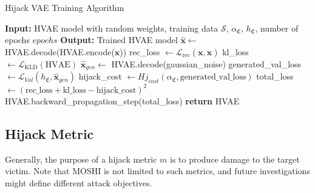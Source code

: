 \begin{algorithm}[H]
\footnotesize
    \caption{Hijack VAE Training Algorithm}
    \begin{algorithmic}[1]
        \State \textbf{Input:} HVAE model with random weights, training data $\mathcal{S}$, $\alpha_{\mathfrak{C}}$, $h_{\mathfrak{C}}$, number of epochs $epochs$
        \State \textbf{Output:} Trained HVAE model
                \State $\hat{\bm{x}} \gets $ HVAE.decode(HVAE.encode($\bm{x}$))  %
                \State rec\_loss $\gets \mathcal{L}_{\mathrm{rec}}(\bm{x}, \hat{\bm{x}})$  %
                \State kl\_loss $\gets \mathcal{L}_{\mathrm{KLD}}(\mathrm{HVAE})$  %
                \State $\hat{\bm{x}}_{gen} \gets$ HVAE.decode(gaussian\_noise)  %
                \State generated\_val\_loss $\gets \mathcal{L}_{Val}(h_{\mathfrak{C}}, \hat{\bm{x}}_{gen})$  %
                \State hijack\_cost $\gets Hj_{cost}(\alpha_{\mathfrak{C}}, \mathrm{generated\_val\_loss})$  %
                \State total\_loss $ \gets(\mathrm{rec\_loss + kl\_loss - hijack\_cost})^2 $  %
                \State HVAE.backward\_propagation\_step(total\_loss)  %
            \EndFor
        \EndFor
        \State \textbf{return} HVAE
    \end{algorithmic}
    \label{alg.HVAE}
\end{algorithm}

\subsection{Hijack Metric}
\label{ssec.hm-theory}
Generally, the purpose of a hijack metric $m$ is to produce damage to the target victim. 
Note that MOSHI is not limited to such metrics, and future investigations might define different attack objectives. 

